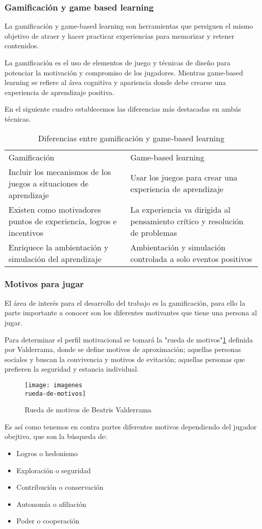 \subsubsection{Gamificación y game based learning}
La gamificación y game-based learning son herramientas que persiguen el mismo objetivo de atraer y hacer practicar experiencias para memorizar y retener contenidos.

La gamificación es el uso de elementos de juego y técnicas de diseño para potenciar la motivación y compromiso de los jugadores. Mientras game-based learning se refiere al área cognitiva y apariencia donde debe crearse una experiencia de aprendizaje positiva.

En el siguiente cuadro\cite{gabale} establecemos las diferencias más destacadas en ambás técnicas.

\begin{table}[htbp]
	\centering
	\caption{Diferencias entre gamificación y game-based learning}
	\label{gabale}
	\begin{tabular}{ll}
		Gamificación                                                        & Game-based learning                                                         \\
		Incluir los mecanismos de los juegos a situaciones de aprendizaje   & Usar los juegos para crear una experiencia de aprendizaje                   \\
		Existen como motivadores puntos de experiencia, logros e incentivos & La experiencia va dirigida al pensamiento crítico y resolución de problemas \\
		Enriquece la ambientación y simulación del aprendizaje              & Ambientación y simulación controlada a solo eventos positivos              
	\end{tabular}
\end{table}

\subsubsection{Motivos para jugar}
El área de interés para el desarrollo del trabajo es la gamificación, para ello la parte importante a conocer son los diferentes motivantes que tiene una persona al jugar.

Para determinar el perfil motivacional se tomará la "rueda de motivos"\ref{fig:rm} definida por Valderrama\cite{valde}, donde se define motivos de aproximación; aquellas personas sociales y buscan la convivencia y motivos de evitación; aquellas personas que prefieren la seguridad y estancia individual.
\begin{figure}
	\centering
	\caption{Rueda de motivos de Beatris Valderrama}
	\label{fig:rm}
	\texttt{[image: imagenes\\rueda-de-motivos]}
\end{figure}

Es así como tenemos en contra partes diferentes motivos dependiendo del jugador obejtivo, que son la búsqueda de:
\begin{itemize}
	\item Logros o hedonismo
	\item Exploración o seguridad
	\item Contribución o conservación
	\item Autonomía o afiliación
	\item Poder o cooperación
\end{itemize}
 